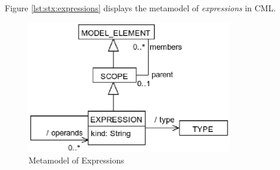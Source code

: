 Figure \ref{lst:stx:expressions} displays the metamodel of
\emph{expressions} in CML.

\begin{figure}[H]
\centering
\includegraphics[width=0.8\textwidth]{metamodel/expressions}
\caption{Metamodel of Expressions}
\label{fig:meta:expressions}
\end{figure}
